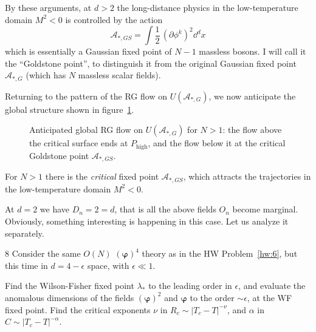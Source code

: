 By these arguments, at $d>2$ the long-distance physics in the low-temperature
domain $M^2<0$ is controlled by the action
\[
\mathcal A_{*,GS}=\int\frac12\,(\partial\phi^k)^2\dd^dx
\]
which is essentially a Gaussian fixed point of $N-1$ massless bosons. I will call
it the ``Goldstone point'', to distinguish it from the original Gaussian fixed
point $\mathcal A_{*,G}$ (which has $N$ massless scalar fields).

Returning to the pattern of the RG flow on $U(\mathcal A_{*,G})$, we now anticipate
the global structure shown in figure~\ref{fig:onglobal}.
\begin{figure}[ht]
\centering{}
\caption{Anticipated global RG flow on $U(\mathcal A_{*,G})$ for $N>1$: the flow
above the critical surface ends at $P_{\text{high}}$, and the flow below it at the
critical Goldstone point $\mathcal A_{*,GS}$.}
\label{fig:onglobal}
\end{figure}
For $N>1$ there is the \emph{critical} fixed point $\mathcal A_{*,GS}$, which
attracts the trajectories in the low-temperature domain $M^2<0$.

At $d=2$ we have $D_n=2=d$, that is all the above fields $O_n$ become marginal.
Obviously, something interesting is happening in this case. Let us analyze it
separately.

\begin{hwproblem}{8}\label{hw:8}
Consider the same $O(N)$ $(\bm{\varphi})^4$ theory as in the HW
Problem~\ref{hw:6}, but this time in $d=4-\epsilon$ space, with $\epsilon\ll1$.

Find the Wilson-Fisher fixed point $\lambda_*$ to the leading order in $\epsilon$,
and evaluate the anomalous dimensions of the fields $(\bm{\varphi})^2$ and
$\bm{\varphi}$ to the order $\sim\epsilon$, at the WF fixed point. Find the critical
exponents $\nu$ in $R_c\sim|T_c-T|^{-\nu}$, and $\alpha$ in
$C\sim|T_c-T|^{-\alpha}$.
\end{hwproblem}
